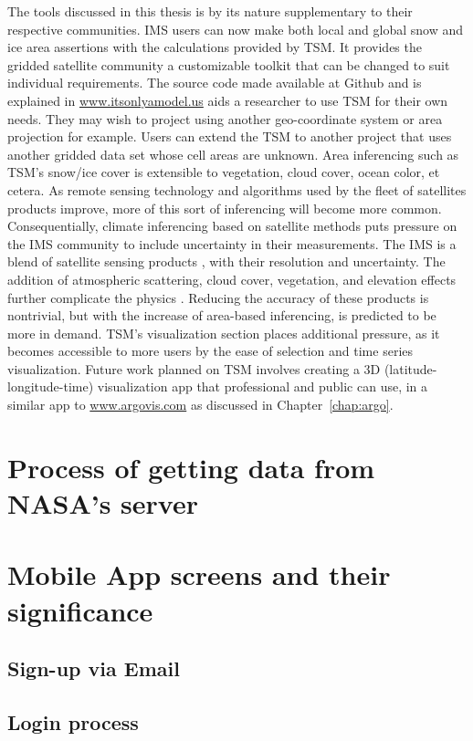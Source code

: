 The tools discussed in this thesis is by its nature supplementary to their respective communities. IMS users can now make both local and global snow and ice area assertions with the calculations provided by TSM. It provides the gridded satellite community a customizable toolkit that can be changed to suit individual requirements. The source code made available at Github \cite{git_proj} and is explained in \url{www.itsonlyamodel.us} \cite{tibet_snow_man} aids a researcher to use TSM for their own needs. They may wish to project using another geo-coordinate system or area projection for example. Users can extend the TSM to another project that uses another gridded data set whose cell areas are unknown. Area inferencing such as TSM's snow/ice cover is extensible to vegetation, cloud cover, ocean color, et cetera. As remote sensing technology and algorithms used by the fleet of satellites products improve, more of this sort of inferencing will become more common. Consequentially, climate inferencing based on satellite methods puts pressure on the IMS community to include uncertainty in their measurements. The IMS is a blend of satellite sensing products \cite{nat_ice}, with their resolution and uncertainty. The addition of atmospheric scattering, cloud cover, vegetation, and elevation effects further complicate the physics \cite{basist}. Reducing the accuracy of these products is nontrivial, but with the increase of area-based inferencing, is predicted to be more in demand. TSM's visualization section places additional pressure, as it becomes accessible to more users by the ease of selection and time series visualization. Future work planned on TSM involves creating a 3D (latitude-longitude-time) visualization app that professional and public can use, in a similar app to \url{www.argovis.com} as discussed in Chapter~\ref{chap:argo}.

\section{Process of getting data from NASA's server}
\section{Mobile App screens and their significance}

\subsection{Sign-up via Email}
\subsection{Login process}
